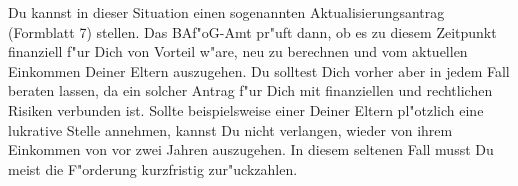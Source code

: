 \begin{artikel}{}
\vspace{-24pt}
Du kannst in dieser Situation einen sogenannten Aktualisierungsantrag (Formblatt 7) stellen. Das BAf"oG-Amt pr"uft dann, ob es zu diesem Zeitpunkt finanziell f"ur Dich von Vorteil w"are, neu zu berechnen und vom aktuellen Einkommen Deiner Eltern auszugehen. Du solltest Dich vorher aber in jedem Fall beraten lassen, da ein solcher Antrag f"ur Dich mit finanziellen und rechtlichen Risiken verbunden ist. Sollte beispielsweise einer Deiner Eltern pl"otzlich eine lukrative Stelle annehmen, kannst Du nicht verlangen, wieder von ihrem Einkommen von vor zwei Jahren auszugehen. In diesem seltenen Fall musst Du meist die F"orderung kurzfristig zur"uckzahlen.
\end{artikel}
